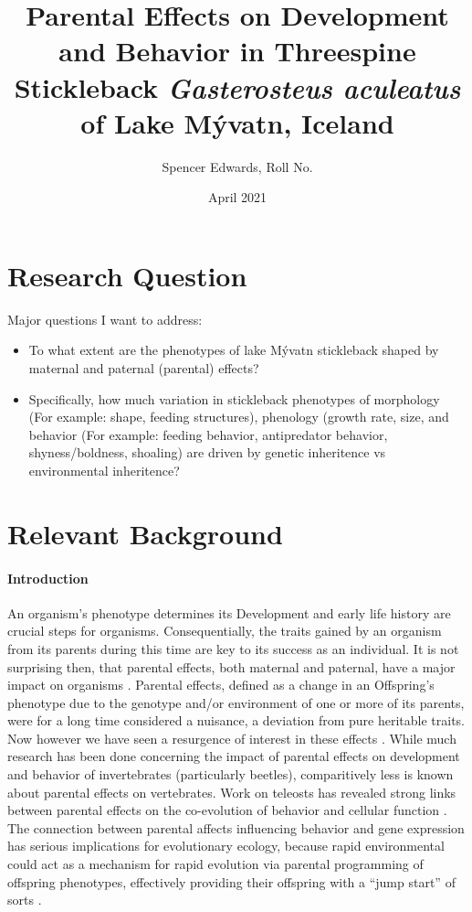 \documentclass[12pt]{extarticle}
\title{Parental Effects on Development and Behavior in Threespine Stickleback \textit{Gasterosteus aculeatus} of Lake M\'yvatn, Iceland}
\author{Spencer Edwards, Roll No.}
\date{April 2021}
\begin{document}
\maketitle

\section*{Research Question}
Major questions I want to address:
\begin{itemize}
 \item To what extent are the phenotypes of lake M\'yvatn stickleback 
shaped by maternal and paternal (parental) effects?
 \item Specifically, how much variation in stickleback phenotypes of morphology (For example:  shape, feeding structures), phenology (growth rate, size,  and behavior (For example: feeding behavior, antipredator behavior, shyness/boldness, shoaling) are driven by genetic inheritence vs environmental inheritence?
\end{itemize}

\section*{Relevant Background}
\paragraph{Introduction}
An organism’s phenotype determines its  
Development and early life history are crucial steps for organisms. Consequentially, the traits gained by an organism from its parents during this time are key to its success as an individual.  It is not surprising then, that parental effects, both maternal and paternal, have a major impact on organisms \citep{charmantier_garant_kruuk_2014, Danchin2011, Badyaev2009}. Parental effects, defined as a change in an Offspring's phenotype due to the genotype and/or environment of one or more of its parents, were for a long time considered a nuisance, a deviation from pure heritable traits. Now however we have seen a resurgence of interest in these effects \citep{charmantier_garant_kruuk_2014}. While much research has been done concerning the impact of parental effects on development \citep{Tigreros2021} and behavior of invertebrates (particularly beetles), comparitively less is known about parental effects on vertebrates. Work on teleosts has revealed strong links between parental effects on the co-evolution of behavior and cellular function \citep{Yoshizawa2012}. The connection between parental affects influencing behavior and gene expression has serious implications for evolutionary ecology, because rapid environmental could act as a mechanism for rapid evolution via parental programming of offspring phenotypes, effectively providing their offspring with a ``jump start'' of sorts \citep{Danchin2011, Donelson2018}. 
\end{document}
